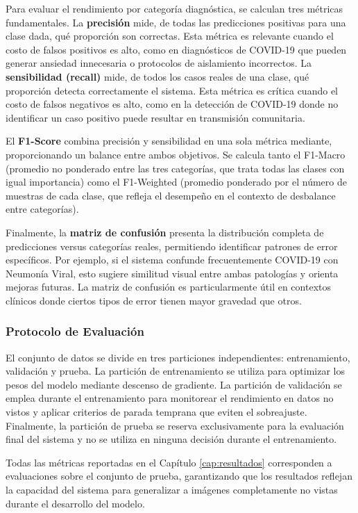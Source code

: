 Para evaluar el rendimiento por categoría diagnóstica, se calculan tres métricas fundamentales. La \textbf{precisión} mide, de todas las predicciones positivas para una clase dada, qué proporción son correctas. Esta métrica es relevante cuando el costo de falsos positivos es alto, como en diagnósticos de COVID-19 que pueden generar ansiedad innecesaria o protocolos de aislamiento incorrectos. La \textbf{sensibilidad (recall)} mide, de todos los casos reales de una clase, qué proporción detecta correctamente el sistema. Esta métrica es crítica cuando el costo de falsos negativos es alto, como en la detección de COVID-19 donde no identificar un caso positivo puede resultar en transmisión comunitaria.

El \textbf{F1-Score} combina precisión y sensibilidad en una sola métrica mediante, proporcionando un balance entre ambos objetivos. Se calcula tanto el F1-Macro (promedio no ponderado entre las tres categorías, que trata todas las clases con igual importancia) como el F1-Weighted (promedio ponderado por el número de muestras de cada clase, que refleja el desempeño en el contexto de desbalance entre categorías).

Finalmente, la \textbf{matriz de confusión} presenta la distribución completa de predicciones versus categorías reales, permitiendo identificar patrones de error específicos. Por ejemplo, si el sistema confunde frecuentemente COVID-19 con Neumonía Viral, esto sugiere similitud visual entre ambas patologías y orienta mejoras futuras. La matriz de confusión es particularmente útil en contextos clínicos donde ciertos tipos de error tienen mayor gravedad que otros.

\subsubsection{Protocolo de Evaluación}
\label{subsubsec:protocolo_evaluacion}

El conjunto de datos se divide en tres particiones independientes: entrenamiento, validación y prueba. La partición de entrenamiento se utiliza para optimizar los pesos del modelo mediante descenso de gradiente. La partición de validación se emplea durante el entrenamiento para monitorear el rendimiento en datos no vistos y aplicar criterios de parada temprana que eviten el sobreajuste. Finalmente, la partición de prueba se reserva exclusivamente para la evaluación final del sistema y no se utiliza en ninguna decisión durante el entrenamiento.

Todas las métricas reportadas en el Capítulo \ref{cap:resultados} corresponden a evaluaciones sobre el conjunto de prueba, garantizando que los resultados reflejan la capacidad del sistema para generalizar a imágenes completamente no vistas durante el desarrollo del modelo.


